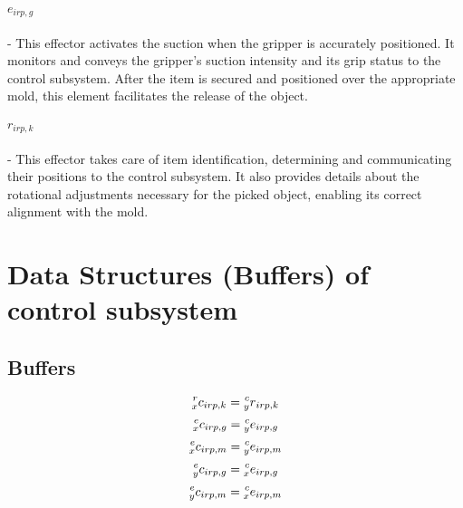 \documentclass[12pt]{article}
\begin{document}
\paragraph{$e_{irp, g}$} - This effector activates the suction when the gripper is accurately positioned. It monitors and conveys the gripper's suction intensity and its grip status to the control subsystem. After the item is secured and positioned over the appropriate mold, this element facilitates the release of the object.

\paragraph{$r_{irp, k}$} - This effector takes care of item identification, determining and communicating their positions to the control subsystem. It also provides details about the rotational adjustments necessary for the picked object, enabling its correct alignment with the mold.

\section{Data Structures (Buffers) of control subsystem}
\subsection{Buffers}
\[ \prescript{r}{x}{c}_{irp, k} = \prescript{c}{y}{r}_{irp, k} \]
\[ \prescript{e}{x}{c}_{irp, g} = \prescript{c}{y}{e}_{irp, g} \]
\[ \prescript{e}{x}{c}_{irp, m} = \prescript{c}{y}{e}_{irp, m} \]
\[ \prescript{e}{y}{c}_{irp, g} = \prescript{c}{x}{e}_{irp, g} \]
\[ \prescript{e}{y}{c}_{irp, m} = \prescript{c}{x}{e}_{irp, m} \]
\end{document}
